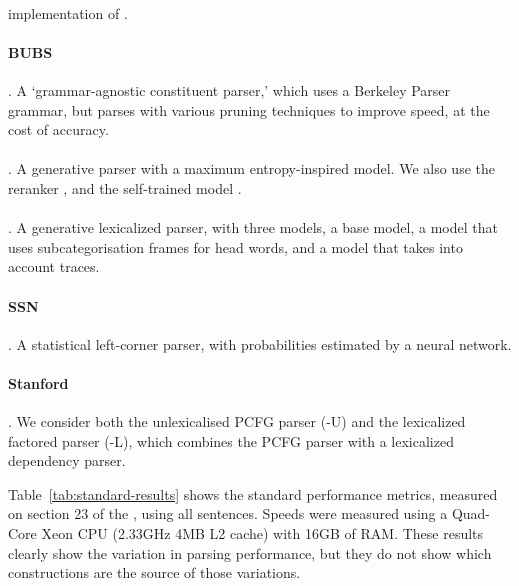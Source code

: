 \paragraph{\textcite{Bikel:2004}} implementation of \textcite{Collins:1997}.

\paragraph{BUBS} \parencite{Dunlop-Bodenstab-Roark:2011,Bodenstab-Dunlop-Hall-Roark:2011}.
A `grammar-agnostic constituent parser,' which uses a Berkeley Parser grammar, but parses with various pruning techniques to improve speed, at the cost of accuracy.

\paragraph{\textcite{Charniak:2000}}.
A generative parser with a maximum entropy-inspired model.
We also use the reranker \parencite{Charniak-Johnson:2005}, and the self-trained model \parencite{McClosky-Charniak-Johnson:2006}.

\paragraph{\textcite{Collins:1997}}.
A generative lexicalized parser, with three models, a base model, a model that uses subcategorisation frames for head words, and a model that takes into account traces.

\paragraph{SSN} \parencite{Henderson:2003,Henderson:2004}.
A statistical left-corner parser, with probabilities estimated by a neural network.

\paragraph{Stanford} \parencite{Klein-Manning:2003:ACL,Klein-Manning:2003:NIPS}.
We consider both the unlexicalised PCFG parser (-U) and the lexicalized factored parser (-L), which combines the PCFG parser with a lexicalized dependency parser.

Table~\ref{tab:standard-results} shows the standard performance metrics,
measured on section 23 of the \wsj, using all sentences.  Speeds were measured
using a Quad-Core Xeon CPU (2.33GHz 4MB L2 cache) with 16GB of RAM.
These results clearly show the variation in parsing performance, but they do
not show which constructions are the source of those variations.


